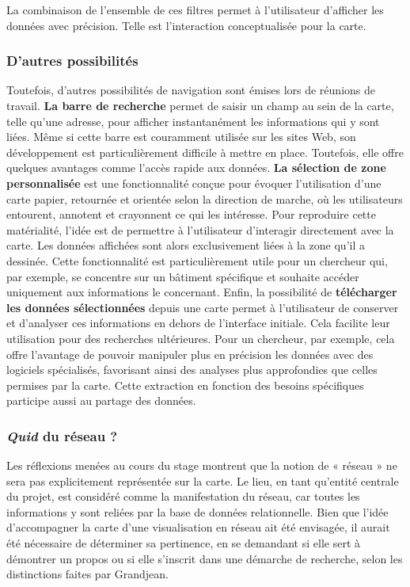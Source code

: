 La combinaison de l'ensemble de ces filtres permet à l'utilisateur d'afficher les données avec précision. Telle est l'interaction conceptualisée pour la carte. 

\subsubsection{D'autres possibilités}
Toutefois, d'autres possibilités de navigation sont émises lors de réunions de travail. 
\textbf{La barre de recherche} permet de saisir un champ au sein de la carte, telle qu'une adresse, pour afficher instantanément les informations qui y sont liées. Même si cette barre est couramment utilisée sur les sites Web, son développement est particulièrement difficile à mettre en place. Toutefois, elle offre quelques avantages comme l'accès rapide aux données. \textbf{La sélection de zone personnalisée} est une fonctionnalité conçue pour évoquer l'utilisation d'une carte papier, retournée et orientée selon la direction de marche, où les utilisateurs entourent, annotent et crayonnent ce qui les intéresse. Pour reproduire cette matérialité, l'idée est de permettre à l'utilisateur d'interagir directement avec la carte. Les données affichées sont alors exclusivement liées à la zone qu'il a dessinée. Cette fonctionnalité est particulièrement utile pour un chercheur qui, par exemple, se concentre sur un bâtiment spécifique et souhaite accéder uniquement aux informations le concernant. Enfin, la possibilité de \textbf{télécharger les données sélectionnées} depuis une carte permet à l'utilisateur de conserver et d'analyser ces informations en dehors de l'interface initiale. Cela facilite leur utilisation pour des recherches ultérieures. Pour un chercheur, par exemple, cela offre l'avantage de pouvoir manipuler plus en précision les données avec des logiciels spécialisés, favorisant ainsi des analyses plus approfondies que celles permises par la carte. Cette extraction en fonction des besoins spécifiques participe aussi au partage des données. 

\subsubsection{\textit{Quid} du réseau ?}
Les réflexions menées au cours du stage montrent que la notion de « réseau » ne sera pas explicitement représentée sur la carte. Le lieu, en tant qu'entité centrale du projet, est considéré comme la manifestation du réseau, car toutes les informations y sont reliées par la base de données relationnelle. Bien que l'idée d'accompagner la carte d'une visualisation en réseau ait été envisagée, il aurait été nécessaire de déterminer sa pertinence, en se demandant si elle sert à démontrer un propos ou si elle s'inscrit dans une démarche de recherche, selon les distinctions faites par Grandjean.
\\


